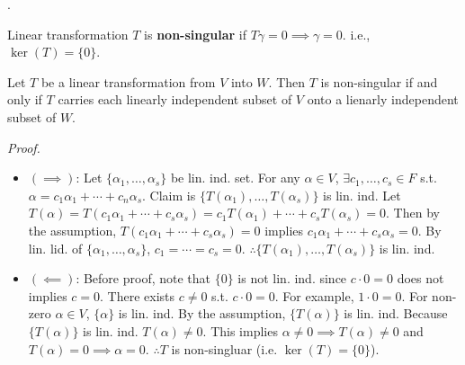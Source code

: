 \documentclass[8pt]{beamer}
\newcommand{\tb}[1]{\textbf{#1}}
\newcommand{\ti}[1]{\textit{#1}}
\begin{document}
\begin{frame}{.}
    \begin{definition}
        Linear transformation $T$ is \tb{non-singular} if $T\gamma = 0 \implies \gamma = 0$. i.e., $\ker(T) = \{0\}$.

        \begin{theorem}
            Let $T$ be a linear transformation from $V$ into $W$. Then $T$ is non-singular if and only if $T$ carries each linearly independent subset of $V$ onto a lienarly independent subset of $W$.
        \end{theorem}
        \ti{Proof.}
        \begin{itemize}
            \item $(\implies)$: Let $\{\alpha_1, \dots, \alpha_s\}$ be lin. ind. set.
            For any $\alpha \in V$, $\exists c_1, \dots, c_s \in F$ s.t. $\alpha = c_1 \alpha_1 + \cdots + c_n \alpha_s$.
            Claim is $\{T(\alpha_1), \dots, T(\alpha_s)\}$ is lin. ind.
            Let $T(\alpha) = T(c_1\alpha_1 + \cdots + c_s \alpha_s) = c_1 T(\alpha_1) + \cdots + c_s T(\alpha_s)= 0$.
            Then by the assumption, $T(c_1\alpha_1 + \cdots + c_s \alpha_s) = 0$ implies $c_1\alpha_1 + \cdots + c_s \alpha_s = 0$.
            By lin. lid. of $\{\alpha_1, \dots, \alpha_s\}$, $c_1 = \cdots = c_s = 0$.
            $\therefore \{T(\alpha_1),\dots, T(\alpha_s)\}$ is lin. ind.
            \item $(\impliedby)$: Before proof, note that $\{0\}$ is not lin. ind. since $c \cdot 0 = 0$ does not implies $c = 0$.
            There exists $c \neq 0$ s.t. $c \cdot 0 = 0$. For example, $1 \cdot 0 = 0$.
            For non-zero $\alpha \in V$, $\{\alpha\}$ is lin. ind.
            By the assumption, $\{T(\alpha)\}$ is lin. ind. Because $\{T(\alpha)\}$ is lin. ind. $T(\alpha) \neq 0$. This implies $\alpha \neq 0 \implies T(\alpha) \neq 0$ and $T(\alpha) = 0 \implies \alpha = 0$. $\therefore T$ is non-singluar (i.e. $\ker(T) = \{0\}$).
        \end{itemize}
    \end{definition}
\end{frame}
\end{document}
